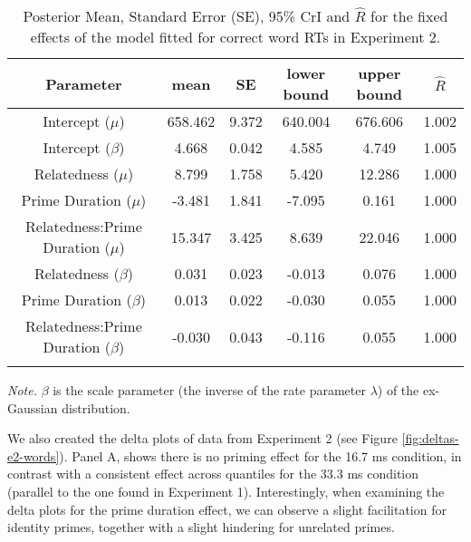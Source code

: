 \documentclass[
  english,
  man,floatsintext]{apa6}
\begin{document}
\begin{table}[H]

\begin{center}
\begin{threeparttable}

\caption{\label{tab:exp2-blmm-table}Posterior Mean, Standard Error (SE), 95\% CrI and \(\hat{R}\) for the fixed effects of the model fitted for correct word RTs in Experiment 2.}

\small{

\begin{tabular}{cccccc}
\toprule
Parameter & \multicolumn{1}{c}{mean} & \multicolumn{1}{c}{SE} & \multicolumn{1}{c}{lower bound} & \multicolumn{1}{c}{upper bound} & \multicolumn{1}{c}{$\hat{R}$}\\
\midrule
Intercept ($\mu$) & 658.462 & 9.372 & 640.004 & 676.606 & 1.002\\
Intercept ($\beta$) & 4.668 & 0.042 & 4.585 & 4.749 & 1.005\\
Relatedness ($\mu$) & 8.799 & 1.758 & 5.420 & 12.286 & 1.000\\
Prime Duration ($\mu$) & -3.481 & 1.841 & -7.095 & 0.161 & 1.000\\
Relatedness:Prime Duration ($\mu$) & 15.347 & 3.425 & 8.639 & 22.046 & 1.000\\
Relatedness ($\beta$) & 0.031 & 0.023 & -0.013 & 0.076 & 1.000\\
Prime Duration ($\beta$) & 0.013 & 0.022 & -0.030 & 0.055 & 1.000\\
Relatedness:Prime Duration ($\beta$) & -0.030 & 0.043 & -0.116 & 0.055 & 1.000\\
\bottomrule
\addlinespace
\end{tabular}

}

\begin{tablenotes}[para]
\normalsize{\textit{Note.} $\beta$ is the scale parameter (the inverse of the rate parameter $\lambda$) of the ex-Gaussian distribution.}
\end{tablenotes}

\end{threeparttable}
\end{center}

\end{table}

We also created the delta plots of data from Experiment 2 (see Figure \ref{fig:deltas-e2-words}). Panel A, shows there is no priming effect for the 16.7 ms condition, in contrast with a consistent effect across quantiles for the 33.3 ms condition (parallel to the one found in Experiment 1). Interestingly, when examining the delta plots for the prime duration effect, we can observe a slight facilitation for identity primes, together with a slight hindering for unrelated primes.
\end{document}
